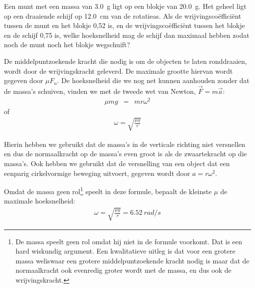 


\item \begin{minipage}[t]{.67\linewidth}
Een munt met een massa van \SI{3,0}{g} ligt op een blokje van \SI{20,0}{g}. Het geheel ligt op een draaiende schijf op \SI{12,0}{cm} van de rotatieas. Als de wrijvingsco\"effici\"ent tussen de munt en het blokje 0,52 is, en de wrij\-vings\-co\"effici\"ent tussen het blokje en de schijf 0,75 is, welke hoeksnelheid mag de schijf dan maximaal hebben zodat noch de munt noch het blokje wegschuift?
\end{minipage}
\hfill
\begin{minipage}[t]{.3\linewidth}
\end{minipage}

\begin{oplossing}
	De middelpuntzoekende kracht die nodig is om de objecten te laten ronddraaien, wordt door de wrijvingskracht geleverd. De maximale grootte hiervan wordt gegeven door $\mu F_n$. De hoeksnelheid die we nog net kunnen aanhouden zonder dat de massa's schuiven, vinden we met de tweede wet van Newton, $\vec{F}=m\vec{a}$:
	\begin{eqnarray*}
		\mu mg&=&mr\omega^2
	\end{eqnarray*}
	of
		\begin{eqnarray*}
\omega=\sqrt{\frac{\mu g}{r}}
	\end{eqnarray*}
	
Hierin hebben we gebruikt dat de massa's in de verticale richting niet versnellen en dus de normaalkracht op de massa's even groot is als de zwaartekracht op die massa's. Ook hebben we gebruikt dat de versnelling van een object dat een eenparig cirkelvormige beweging uitvoert, gegeven wordt door $a=r\omega^2$.

Omdat de massa geen rol\footnote{De massa speelt geen rol omdat hij niet in de formule voorkomt. Dat is een hard wiskundig argument. Een kwalitatieve uitleg is dat voor een grotere massa weliswaar een grotere middelpuntzoekende kracht nodig is maar dat de normaalkracht ook evenredig groter wordt met de massa, en dus ook de wrijvingskracht.} speelt in deze formule, bepaalt de kleinste $\mu$ de maximale hoeksnelheid:
 \begin{eqnarray*}
\omega=\sqrt{\frac{\mu g}{r}}=\SI{6,52}{rad/s}
	\end{eqnarray*}
\end{oplossing}